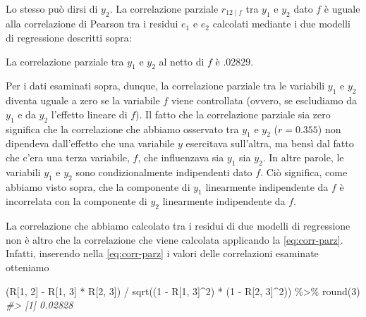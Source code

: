 \documentclass[
  11pt,
]{krantz}
\makeatletter
\newenvironment{Shaded}{\begin{snugshade}}{\end{snugshade}}
\newcommand{\CommentTok}[1]{\textcolor[rgb]{0.37,0.37,0.37}{\textit{#1}}}
\newcommand{\DecValTok}[1]{\textcolor[rgb]{0.06,0.06,0.06}{#1}}
\newcommand{\FunctionTok}[1]{\textcolor[rgb]{0,0,0}{#1}}
\newcommand{\NormalTok}[1]{#1}
\newcommand{\SpecialCharTok}[1]{\textcolor[rgb]{0,0,0}{#1}}
\newenvironment{kframe}{%
\medskip{}
\setlength{\fboxsep}{.8em}
 \def\at@end@of@kframe{}%
 \ifinner\ifhmode%
  \def\at@end@of@kframe{\end{minipage}}%
  \begin{minipage}{\columnwidth}%
 \fi\fi%
 \def\FrameCommand##1{\hskip\@totalleftmargin \hskip-\fboxsep
 \colorbox{shadecolor}{##1}\hskip-\fboxsep
     \hskip-\linewidth \hskip-\@totalleftmargin \hskip\columnwidth}%
 \MakeFramed {\advance\hsize-\width
   \@totalleftmargin\z@ \linewidth\hsize
   \@setminipage}}%
 {\par\unskip\endMakeFramed%
 \at@end@of@kframe}
\renewenvironment{Shaded}{\begin{kframe}}{\end{kframe}}
\theoremstyle{definition}
\theoremstyle{definition}
\theoremstyle{definition}
\theoremstyle{definition}
\theoremstyle{remark}
\makeatother
\begin{document}
Lo stesso può dirsi di \(y_2\). La correlazione parziale \(r_{12 \mid f}\) tra \(y_1\) e \(y_2\) dato \(f\) è uguale alla correlazione di Pearson tra i residui \(e_1\) e \(e_2\) calcolati mediante i due modelli di regressione descritti sopra:

\begin{Shaded}
\end{Shaded}

La correlazione parziale tra \(y_1\) e \(y_2\) al netto di \(f\) è .02829.

Per i dati esaminati sopra, dunque, la correlazione parziale tra le variabili \(y_1\) e \(y_2\) diventa uguale a zero se la variabile \(f\) viene controllata (ovvero, se escludiamo da \(y_1\) e da \(y_2\) l'effetto lineare di \(f\)). Il fatto che la correlazione parziale sia zero significa che la correlazione che abbiamo osservato tra \(y_1\) e \(y_2\) (\(r = 0.355\)) non dipendeva dall'effetto che una variabile \(y\) esercitava sull'altra, ma bensì dal fatto che c'era una terza variabile, \(f\), che influenzava sia \(y_1\) sia \(y_2\). In altre parole, le variabili \(y_1\) e \(y_2\) sono condizionalmente indipendenti dato \(f\). Ciò significa, come abbiamo visto sopra, che la componente di \(y_1\) linearmente indipendente da \(f\) è incorrelata con la componente di \(y_2\) linearmente indipendente da \(f\).

La correlazione che abbiamo calcolato tra i residui di due modelli di regressione non è altro che la correlazione che viene calcolata applicando la \eqref{eq:corr-parz}. Infatti, inserendo nella \eqref{eq:corr-parz} i valori delle correlazioni esaminate otteniamo

\begin{Shaded}
\begin{Highlighting}[]
\NormalTok{(R[}\DecValTok{1}\NormalTok{, }\DecValTok{2}\NormalTok{] }\SpecialCharTok{{-}}\NormalTok{ R[}\DecValTok{1}\NormalTok{, }\DecValTok{3}\NormalTok{] }\SpecialCharTok{*}\NormalTok{ R[}\DecValTok{2}\NormalTok{, }\DecValTok{3}\NormalTok{]) }\SpecialCharTok{/}
  \FunctionTok{sqrt}\NormalTok{((}\DecValTok{1} \SpecialCharTok{{-}}\NormalTok{ R[}\DecValTok{1}\NormalTok{, }\DecValTok{3}\NormalTok{]}\SpecialCharTok{\^{}}\DecValTok{2}\NormalTok{) }\SpecialCharTok{*}\NormalTok{ (}\DecValTok{1} \SpecialCharTok{{-}}\NormalTok{ R[}\DecValTok{2}\NormalTok{, }\DecValTok{3}\NormalTok{]}\SpecialCharTok{\^{}}\DecValTok{2}\NormalTok{)) }\SpecialCharTok{\%\textgreater{}\%}
    \FunctionTok{round}\NormalTok{(}\DecValTok{3}\NormalTok{)}
\CommentTok{\#\textgreater{} [1] 0.02828}
\end{Highlighting}
\end{Shaded}
\end{document}
